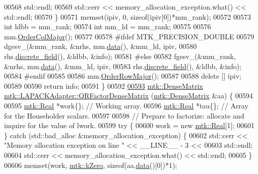\begin{DoxyCode}
00568       std::endl;
00569     std::cerr << memory\_allocation\_exception.what() << std::endl;
00570   \}
00571   memset(ipiv, 0, \textcolor{keyword}{sizeof}(ipiv[0])*mm\_rank);
00572 
00573   \textcolor{keywordtype}{int} ldbb = mm\_rank;
00574   \textcolor{keywordtype}{int} mm\_ld = mm\_rank;
00575 
00576   mm.\hyperlink{classmtk_1_1DenseMatrix_a59b9bea24acf39dca64e8549b3527463}{OrderColMajor}();
00577 
00578 \textcolor{preprocessor}{  #ifdef MTK\_PRECISION\_DOUBLE}
00579   dgesv\_(&mm\_rank, &nrhs, mm.\hyperlink{classmtk_1_1DenseMatrix_a0c33b8a9e01d157c61ddbdf807c25d84}{data}(), &mm\_ld, ipiv,
00580          rhs.\hyperlink{classmtk_1_1UniStgGrid2D_a3e72d59843a3f9c5e47da07e5850dfe0}{discrete\_field}(), &ldbb, &info);
00581 \textcolor{preprocessor}{  #else}
00582   fgesv\_(&mm\_rank, &nrhs, mm.\hyperlink{classmtk_1_1DenseMatrix_a0c33b8a9e01d157c61ddbdf807c25d84}{data}(), &mm\_ld, ipiv,
00583          rhs.\hyperlink{classmtk_1_1UniStgGrid2D_a3e72d59843a3f9c5e47da07e5850dfe0}{discrete\_field}(), &ldbb, &info);
00584 \textcolor{preprocessor}{  #endif}
00585 
00586   mm.\hyperlink{classmtk_1_1DenseMatrix_ac2949efba3e8278335d45418c85433e4}{OrderRowMajor}();
00587 
00588   \textcolor{keyword}{delete} [] ipiv;
00589 
00590   \textcolor{keywordflow}{return} info;
00591 \}
00592 
\hypertarget{mtk__lapack__adapter_8cc_source_l00593}{}\hyperlink{classmtk_1_1LAPACKAdapter_ae5c6e78c9c819c9ac7a6f31bfd011d7a}{00593} \hyperlink{classmtk_1_1DenseMatrix}{mtk::DenseMatrix} \hyperlink{classmtk_1_1LAPACKAdapter_ae5c6e78c9c819c9ac7a6f31bfd011d7a}{mtk::LAPACKAdapter::QRFactorDenseMatrix}
      (\hyperlink{classmtk_1_1DenseMatrix}{mtk::DenseMatrix} &aa) \{
00594 
00595   \hyperlink{group__c01-roots_gac080bbbf5cbb5502c9f00405f894857d}{mtk::Real} *work\{\}; \textcolor{comment}{// Working array.}
00596   \hyperlink{group__c01-roots_gac080bbbf5cbb5502c9f00405f894857d}{mtk::Real} *tau\{\};  \textcolor{comment}{// Array for the Householder scalars.}
00597 
00598   \textcolor{comment}{// Prepare to factorize: allocate and inquire for the value of lwork.}
00599   \textcolor{keywordflow}{try} \{
00600     work = \textcolor{keyword}{new} \hyperlink{group__c01-roots_gac080bbbf5cbb5502c9f00405f894857d}{mtk::Real}[1];
00601   \} \textcolor{keywordflow}{catch} (std::bad\_alloc &memory\_allocation\_exception) \{
00602     std::cerr << \textcolor{stringliteral}{"Memory allocation exception on line "} << \_\_LINE\_\_ - 3 <<
00603       std::endl;
00604     std::cerr << memory\_allocation\_exception.what() << std::endl;
00605   \}
00606   memset(work, \hyperlink{group__c01-roots_ga59a451a5fae30d59649bcda274fea271}{mtk::kZero}, \textcolor{keyword}{sizeof}(aa.\hyperlink{classmtk_1_1DenseMatrix_a0c33b8a9e01d157c61ddbdf807c25d84}{data}()[0])*1);

\end{DoxyCode}
